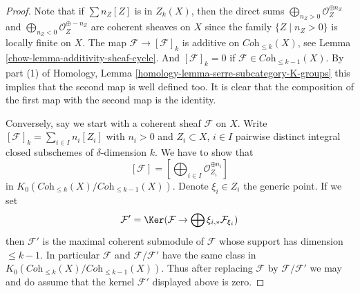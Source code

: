 \begin{proof}

Note that if $\sum n_Z[Z]$ is in $Z_k(X)$, then
the direct sums
$\bigoplus\nolimits_{n_Z > 0} \mathcal{O}_Z^{\oplus n_Z}$ and
$\bigoplus\nolimits_{n_Z < 0} \mathcal{O}_Z^{\oplus -n_Z}$
are coherent sheaves on $X$ since the family $\{Z \mid n_Z > 0\}$
is locally finite on $X$.
The map $\mathcal{F} \to [\mathcal{F}]_k$ is additive
on $\textit{Coh}_{\leq k}(X)$, see
Lemma \ref{chow-lemma-additivity-sheaf-cycle}. And $[\mathcal{F}]_k = 0$
if $\mathcal{F} \in \textit{Coh}_{\leq k - 1}(X)$. By part (1)
of Homology, Lemma \ref{homology-lemma-serre-subcategory-K-groups}
this implies that the second map is well defined too.
It is clear that the composition of the first map with the second
map is the identity.

\medskip\noindent
Conversely, say we start with a coherent sheaf $\mathcal{F}$
on $X$. Write $[\mathcal{F}]_k = \sum_{i \in I} n_i[Z_i]$
with $n_i > 0$ and $Z_i \subset X$, $i \in I$
pairwise distinct integral closed subschemes of $\delta$-dimension $k$.
We have to show that
$$
[\mathcal{F}] = [\bigoplus\nolimits_{i \in I} \mathcal{O}_{Z_i}^{\oplus n_i}]
$$
in $K_0(\textit{Coh}_{\leq k}(X)/\textit{Coh}_{\leq k - 1}(X))$.
Denote $\xi_i \in Z_i$ the generic point.
If we set
$$
\mathcal{F}' = \Ker(\mathcal{F} \to \bigoplus \xi_{i, *}\mathcal{F}_{\xi_i})
$$
then $\mathcal{F}'$ is the maximal coherent submodule of $\mathcal{F}$
whose support has dimension $\leq k - 1$. In particular $\mathcal{F}$
and $\mathcal{F}/\mathcal{F}'$ have the same class in
$K_0(\textit{Coh}_{\leq k}(X)/\textit{Coh}_{\leq k - 1}(X))$.
Thus after replacing $\mathcal{F}$ by $\mathcal{F}/\mathcal{F}'$
we may and do assume that the kernel $\mathcal{F}'$ displayed
above is zero.


\end{proof}
